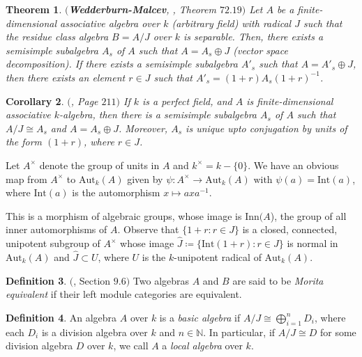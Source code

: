 \documentclass[12pt]{amsart}
\newtheorem{theorem}{Theorem}[section]
\newtheorem{corollary}[theorem]{Corollary}
\theoremstyle{definition}
\newtheorem{definition}[theorem]{Definition}
\numberwithin{equation}{section}
\begin{document}
\vspace{2mm}

\begin{theorem}\label{Theorem 2.1}
\textbf{$($\emph{Wedderburn-Malcev}}, \cite{Curtis}, \emph{Theorem} $72.19)$ Let $A$ be a finite-dimensional associative algebra over $k$ (arbitrary field) with radical $J$ such that the residue class algebra $B=A/J$ over $k$ is separable. Then, there exists a semisimple subalgebra $A_s$ of $A$ such that $A=A_s\oplus J$ (vector space decomposition). If there exists a semisimple subalgebra $A'_s$ such that $A=A'_s\oplus J$, then there exists an element $r\in J$ such that $A'_s=(1+r)A_s(1+r)^{-1}$.
\end{theorem}

\vskip2mm

\begin{corollary}\label{Corollary 2.2}
$($\cite{Pierce}, \emph{Page} $211)$ If $k$ is a perfect field, and $A$ is finite-dimensional associative $k$-algebra, then there is a semisimple subalgebra $A_s$ of $A$ such that $A/J\cong A_s$ and $A=A_s\oplus J$. Moreover, $A_s$ is unique upto
conjugation by units of the form $(1+r)$, where $r\in J$.
\end{corollary}

\vskip2mm 
\noindent
Let $A^{\times}$ denote the group of units in $A$ and $k^{\times}=k-\{0\}$. We have an obvious map from $A^{\times}$ to $\text{Aut}_k(A)$ given  by $\psi:A^{\times}\rightarrow \text{Aut}_k(A) \text{ with }\psi(a)=\text{Int}(a)$, where $\text{Int}(a)$ is the automorphism  $x\mapsto axa^{-1}$.

\vskip2mm
\noindent
This is a morphism of algebraic groups, whose image is $\text{Inn}(A$), the group of all inner automorphisms of $A$. Observe that $\{1+r:r\in J\}$ is a closed, connected, unipotent subgroup of $A^{\times}$ whose image $\hat{J}\coloneq\{\text{Int}(1+r):r\in J\}$ is normal in $\text{Aut}_k(A)$ and $\hat{J}\subset U$, where $U$ is the $k$-unipotent radical of $\text{Aut}_k(A)$.

\vskip2mm

\begin{definition}\label{Definition 2.3}$($\cite{Pierce}, Section $9.6$$)$
Two algebras $A$ and $B$ are said to be \emph{Morita equivalent} if their left module categories are equivalent.
\end{definition}

\vskip2mm
\begin{definition}\label{Definition 2.4}
An algebra $A$ over $k$ is a \emph{basic algebra} if $A/J\cong \bigoplus_{i=1}^{n} D_i$, where each $D_i$ is a division algebra over $k$ and $n\in \mathbb{N}$. In particular, if $A/J\cong D$ for some division algebra $D$ over $k$, we call $A$ a \emph{local algebra} over $k$.  
\end{definition}
\end{document}
